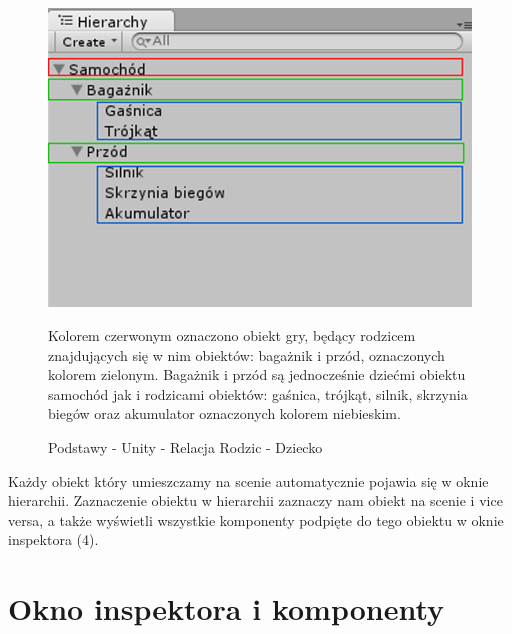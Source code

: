\documentclass[openright]{xmgr}
\begin{document}
\begin{figure}[!htb]
    \begin{center}
    \includegraphics[scale=0.25]{Screeny/rodzial5screeny/przyklad_relacji_rodzic_dziecko}
    \end{center}
    \caption{Podstawy - Unity - Relacja Rodzic - Dziecko}
Kolorem czerwonym oznaczono obiekt gry, będący rodzicem znajdujących się w nim obiektów: bagażnik i przód, oznaczonych kolorem zielonym. Bagażnik i przód są jednocześnie dziećmi obiektu samochód jak i rodzicami obiektów: gaśnica, trójkąt, silnik, skrzynia biegów oraz akumulator oznaczonych kolorem niebieskim.
\end{figure}

Każdy obiekt który umieszczamy na scenie automatycznie pojawia się w oknie hierarchii. Zaznaczenie obiektu w hierarchii zaznaczy nam obiekt na scenie i vice versa, a także wyświetli wszystkie komponenty podpięte do tego obiektu w oknie inspektora (4).

\section{Okno inspektora i komponenty}
\end{document}
